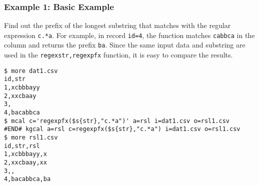 \subsubsection*{Example 1: Basic Example}

Find out the prefix of the longest substring that matches with the regular expression \verb|c.*a|. For example, in record \verb|id=4|, the function matches \verb|cabbca| in the  column and returns the prefix \verb|ba|. Since the same input data and substring are used in the \verb|regexstr,regexpfx| function, it is easy to compare the results.


\begin{Verbatim}[baselinestretch=0.7,frame=single]
$ more dat1.csv
id,str
1,xcbbbayy
2,xxcbaay
3,
4,bacabbca
$ mcal c='regexpfx($s{str},"c.*a")' a=rsl i=dat1.csv o=rsl1.csv
#END# kgcal a=rsl c=regexpfx($s{str},"c.*a") i=dat1.csv o=rsl1.csv
$ more rsl1.csv
id,str,rsl
1,xcbbbayy,x
2,xxcbaay,xx
3,,
4,bacabbca,ba
\end{Verbatim}

